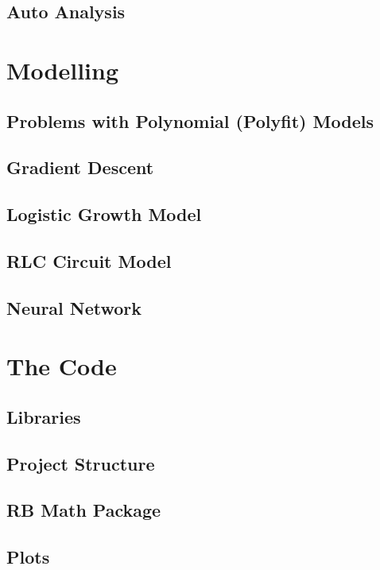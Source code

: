 \documentclass{report}
\begin{document}
        \subsection{Auto Analysis}    
    \section{Modelling}
        \subsection{Problems with Polynomial (Polyfit) Models}
        \subsection{Gradient Descent}
        \subsection{Logistic Growth Model}
        \subsection{RLC Circuit Model}
        \subsection{Neural Network}
    \section{The Code}
        \subsection{Libraries}
        \subsection{Project Structure}
        \subsection{RB Math Package}
        \subsection{Plots}
\end{document}
